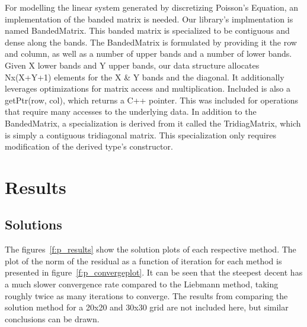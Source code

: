 \documentclass[]{aiaa-tc}%
\begin{document}
For modelling the linear system generated by discretizing Poisson's Equation, an implementation of the banded matrix is needed. Our library's implmentation is named BandedMatrix. This banded matrix is specialized to be contiguous and dense along the bands. The BandedMatrix is formulated by providing it the row and column, as well as a number of upper bands and a number of lower bands. Given X lower bands and Y upper bands, our data structure allocates Nx(X+Y+1) elements for the X & Y bands and the diagonal. It additionally leverages optimizations for matrix access and multiplication. Included is also a getPtr(row, col), which returns a C++ pointer. This was included for operations that require many accesses to the underlying data. In addition to the BandedMatrix, a specialization is derived from it called the TridiagMatrix, which is simply a contiguous tridiagonal matrix. This specialization only requires modification of the derived type's constructor. 

\FloatBarrier\section{Results}

\FloatBarrier\subsection{Solutions}

The figures~\ref{f:p_results} show the solution plots of each respective method.
The plot of the norm of the residual as a function of iteration for each method
is presented in figure~\ref{f:p_convergeplot}. It can be seen that the steepest decent
has a much slower convergence rate compared to the Liebmann method, taking roughly
twice as many iterations to converge. The results from comparing the solution method
for a 20x20 and 30x30 grid are not included here, but similar conclusions can be drawn. 
\end{document}
